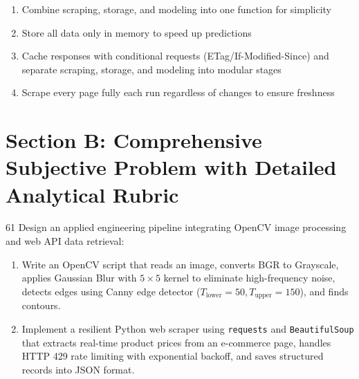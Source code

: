 \begin{enumerate}[label=(\alph*),topsep=2pt,itemsep=1pt,partopsep=0pt,parsep=0pt]
    \item \relax Combine scraping, storage, and modeling into one function for simplicity
    \item \relax Store all data only in memory to speed up predictions
    \item \relax Cache responses with conditional requests (ETag/If-Modified-Since) and separate scraping, storage, and modeling into modular stages
    \item \relax Scrape every page fully each run regardless of changes to ensure freshness
\end{enumerate}
\vspace{2mm}


\newpage
\section{Section B: Comprehensive Subjective Problem with Detailed Analytical Rubric}

\begin{subjectiveq}{6}{1}
Design an applied engineering pipeline integrating OpenCV image processing and web API data retrieval:
\begin{enumerate}[label=(\alph*)]
    \item Write an OpenCV script that reads an image, converts BGR to Grayscale, applies Gaussian Blur with $5 \times 5$ kernel to eliminate high-frequency noise, detects edges using Canny edge detector ($T_{\text{lower}}=50, T_{\text{upper}}=150$), and finds contours.
    \item Implement a resilient Python web scraper using \texttt{requests} and \texttt{BeautifulSoup} that extracts real-time product prices from an e-commerce page, handles HTTP 429 rate limiting with exponential backoff, and saves structured records into JSON format.
\end{enumerate}
\end{subjectiveq}

